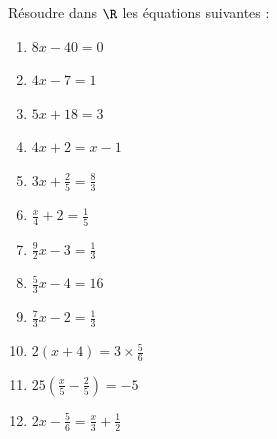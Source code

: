 
\newcommand{\C}{\mathcal{C}}


\pagestyle{fancy}
\fancyhead[R]{\today}

\reversemarginpar

Résoudre dans $\R$ les équations suivantes :

\begin{enumerate}[label=(\alph*)]
\item $8x - 40 = 0$
\item $4x - 7 = 1$
\item $5x + 18 = 3$
\item $4x + 2 = x - 1$
\item $3x + \frac25 = \frac83$
\item $\frac{x}4 + 2 = \frac15$
\item $\frac92 x - 3 = \frac13$
\item $\frac53 x - 4 = 16$
\item $\frac73 x - 2 = \frac13$
\item $2(x + 4) = 3 \times \frac56$
\item $25(\frac{x}5 - \frac25) = -5$
\item $2x - \frac56 = \frac{x}3 + \frac12$
\end{enumerate}

